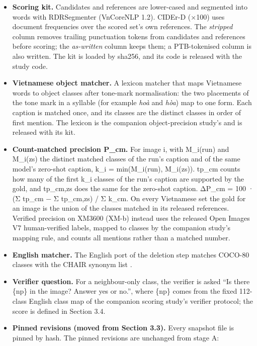 \begin{itemize}
\item
  \textbf{Scoring kit.} Candidates and references are lower-cased and segmented into words with
  RDRSegmenter (VnCoreNLP 1.2). CIDEr-D (×100) uses document frequencies over the scored set's own
  references. The \emph{stripped} column removes trailing punctuation tokens from candidates and
  references before scoring; the \emph{as-written} column keeps them; a PTB-tokenised column is also
  written. The kit is loaded by sha256, and its code is released with the study code.
\item
  \textbf{Vietnamese object matcher.} A lexicon matcher that maps Vietnamese words to object classes
  after tone-mark normalisation: the two placements of the tone mark in a syllable (for example
  \emph{hoà} and \emph{hòa}) map to one form. Each caption is matched once, and its classes are the
  distinct classes in order of first mention. The lexicon is the companion object-precision study's
  and is released with its kit.
\item
  \textbf{Count-matched precision P\_cm.} For image i, with M\_i(run) and M\_i(zs) the distinct
  matched classes of the run's caption and of the same model's zero-shot caption, k\_i =
  min(\textbar M\_i(run)\textbar, \textbar M\_i(zs)\textbar). tp\_cm counts how many of the first
  k\_i classes of the run's caption are supported by the gold, and tp\_cm,zs does the same for the
  zero-shot caption. ΔP\_cm = 100 · (Σ tp\_cm − Σ tp\_cm,zs) / Σ k\_cm. On every Vietnamese set the
  gold for an image is the union of the classes matched in its released references. Verified
  precision on XM3600 (XM-b) instead uses the released Open Images V7 human-verified labels, mapped
  to classes by the companion study's mapping rule, and counts all mentions rather than a matched
  number.
\item
  \textbf{English matcher.} The English port of the deletion step matches COCO-80 classes with the
  CHAIR synonym list \citep{Rohrbach2018CHAIR}.
\item
  \textbf{Verifier question.} For a neighbour-only class, the verifier is asked ``Is there \{np\} in
  the image? Answer yes or no.'', where \{np\} comes from the fixed 112-class English class map of
  the companion scoring study's verifier protocol; the score is defined in Section 3.4.
\item
  \textbf{Pinned revisions (moved from Section 3.3).} Every snapshot file is pinned by hash. The
  pinned revisions are unchanged from stage A:
\end{itemize}

